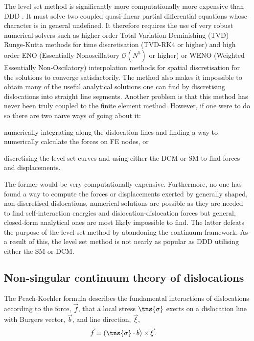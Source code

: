 The level set method is significantly more computationally more expensive than DDD \cite{lvl_set_dd}. It must solve two coupled quasi-linear partial differential equations whose character is in general undefined. It therefore requires the use of very robust numerical solvers such as higher order Total Variation Deminishing (TVD) Runge-Kutta methods for time discretisation (TVD-RK4 or higher) and high order ENO (Essentially Nonoscillatory $ \mathcal{O}(N^5) $ or higher) or WENO (Weighted Essentially Non-Oscilatory) interpolation methods for spatial discretisation \cite{lvl_set_ddd_inc} for the solutions to converge satisfactorily. The method also makes it impossible to obtain many of the useful analytical solutions one can find by discretising dislocations into straight line segments. Another problem is that this method has never been truly coupled to the finite element method. However, if one were to do so there are two naïve ways of going about it:
\begin{inparaenum}
    \item numerically integrating along the dislocation lines and finding a way to numerically calculate the forces on FE nodes, or
    \item discretising the level set curves and using either the DCM or SM to find forces and displacements.
\end{inparaenum}
The former would be very computationally expensive. Furthermore, no one has found a way to compute the forces or displacements exerted by generally shaped, non-discretised dislocations, numerical solutions are possible as they are needed to find self-interaction energies and dislocation-dislocation forces \cite{lvl_set_dd} but general, closed-form analytical ones are most likely impossible to find. The latter defeats the purpose of the level set method by abandoning the continuum framework. As a result of this, the level set method is not nearly as popular as DDD utilising either the SM or DCM.

\subsection{Non-singular continuum theory of dislocations}
\label{ss:non-singular_dln}
The Peach-Koehler formula describes the fundamental interactions of dislocations \cite{pk_force} according to the force, $ \vec{f} $, that a local stress $ \tns{\sigma} $ exerts on a dislocation line with Burgers vector, $ \vec{b} $, and line direction, $ \vec{\xi} $,
\begin{align}
    \vec{f} & = (\tns{\sigma} \cdot \vec{b}) \times \vec{\xi}\,.
\end{align}

